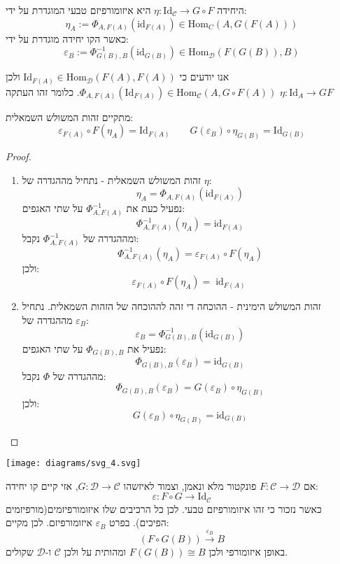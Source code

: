 \documentclass{tstextbook}
\begin{document}
\begin{definition}
היחידה \(\eta:\mathrm{Id}_{\mathcal{C}}\to G \circ F\) היא איזומורפיזם טבעי המוגדרת על ידי:
$$\eta_{A}:=\Phi_{A,F(A)}(\mathrm{id}_{F(A)})\in\mathrm{Hom}_{C}(A,G(F(A)))$$
כאשר הקו יחידה מוגדרת על ידי:
$$\varepsilon_{B}:=\Phi_{G(B),B}^{-1}(\mathrm{id}_{G(B)})\in\mathrm{Hom}_{\mathcal{D}}(F(G(B)),B)$$

\end{definition}
\begin{remark}
אנו יודעים כי \(\mathrm{Id}_{F(A)}\in\mathrm{Hom}_{\mathcal{D}}(F(A),F(A))\) ולכן \(\Phi_{A,F(A)}\left( \mathrm{Id}_{F(A)} \right)\in \mathrm{Hom}_{\mathcal{C}}\left( A,G\circ F(A) \right)\). כלומר זהו העתקה \(\eta:\mathrm{Id}_{A}\to GF\)

\end{remark}
\begin{proposition}
מתקיים זהות המשולש השמאלית:
$$\varepsilon_{F(A)}\circ  F(\eta_{A})=\mathrm{Id}_{F(A)}\qquad G(\varepsilon_{B})\circ \eta_{G(B)}=\mathrm{Id}_{G(B)}$$

\end{proposition}
\begin{proof}
  \begin{enumerate}
    \item זהות המשולש השמאלית - נתחיל מההגדרה של \(\eta\): 
$$\eta_{A}=\Phi_{A,F(A)}(\mathrm{id}_{F(A)})$$
נפעיל כעת את \(\Phi ^{-1}_{A,F(A)}\) על שתי האגפים:
$$\Phi_{A,F(A)}^{-1}(\eta_{A})=\mathrm{id}_{F(A)}$$
ומההגדרה של \(\Phi ^{-1}_{A,F(A)}\) נקבל:
$$\Phi_{A,F(A)}^{-1}(\eta_{A})=\varepsilon_{F(A)}\circ F(\eta_{A})$$
ולכן:
$$\varepsilon_{F(A)}\circ F(\eta_{A})=\operatorname{id}_{F(A)}$$


    \item זהות המשולש הימינית - ההוכחה די זהה לההוכחה של הזהות השמאלית. נתחיל מההגדרה של \(\varepsilon_{B}\): 
$$\varepsilon_{B}=\Phi_{G(B),B}^{-1}(\mathrm{id}_{G(B)})$$
נפעיל את \(\Phi_{G(B),B}\) על שתי האגפים:
$$\Phi_{G(B),B}(\varepsilon_{B})=\mathrm{id}_{G(B)}$$
מההגדרה של \(\Phi\) נקבל:
$$\Phi_{G(B),B}(\varepsilon_{B})=G(\varepsilon_{B})\circ\eta_{G(B)}$$
ולכן:
$$G(\varepsilon_{B})\circ\eta_{G(B)}=\mathrm{id}_{G(B)}$$


  \end{enumerate}
\end{proof}
\texttt{[image: diagrams/svg\_4.svg]}
\begin{example}
אם \(F:\mathcal{C}\to \mathcal{D}\) פונקטור מלא ונאמן, וצמוד לאיזשהו \(G:\mathcal{D}\to \mathcal{C}\), אזי קיים קו יחידה:
$$\varepsilon:F\circ  G\to\mathrm{Id}_{\mathcal{C} }$$
כאשר נזכור כי זהו איזומורפיזם טבעי. לכן כל הרכיבים שלו איזומורפיזמים(מורפיזמים הפיכים). בפרט \(\varepsilon_{B}\) איזומורפיזם. לכן מקיים:
$$\left( F\circ G(B) \right)\xrightarrow{\varepsilon_{B}} B$$
באופן איזומורפי ולכן \(F(G(B))\cong B\) ומהותית על ולכן \(\mathcal{C}\) ו-\(\mathcal{D}\) שקולים.

\end{example}
\end{document}
